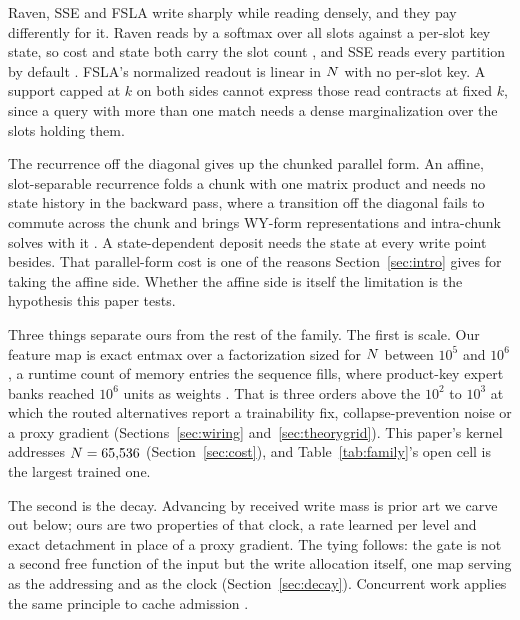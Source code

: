 Raven, SSE and FSLA write sharply while reading densely, and they pay differently for it. Raven reads by a softmax over all slots against a per-slot key state, so cost and state both carry the slot count \citep{afzal2026raven}, and SSE reads every partition by default \citep{sse2025}. FSLA's normalized readout is linear in $N$ with no per-slot key. A support capped at $k$ on both sides cannot express those read contracts at fixed $k$, since a query with more than one match needs a dense marginalization over the slots holding them.

The recurrence off the diagonal gives up the chunked parallel form. An affine, slot-separable recurrence folds a chunk with one matrix product and needs no state history in the backward pass, where a transition off the diagonal fails to commute across the chunk and brings WY-form representations and intra-chunk solves with it \citep{yang2024deltanet, yang2024gdn}. A state-dependent deposit needs the state at every write point besides. That parallel-form cost is one of the reasons Section~\ref{sec:intro} gives for taking the affine side. Whether the affine side is itself the limitation is the hypothesis this paper tests.

Three things separate ours from the rest of the family. The first is scale. Our feature map is exact entmax over a factorization sized for $N$ between $10^5$ and $10^6$, a runtime count of memory entries the sequence fills, where product-key expert banks reached $10^6$ units as weights \citep{lample2019pkm, he2024peer}. That is three orders above the $10^2$ to $10^3$ at which the routed alternatives report a trainability fix, collapse-prevention noise or a proxy gradient (Sections~\ref{sec:wiring} and~\ref{sec:theorygrid}). This paper's kernel addresses $N = 65{,}536$ (Section~\ref{sec:cost}), and Table~\ref{tab:family}'s open cell is the largest trained one.

The second is the decay. Advancing by received write mass is prior art we carve out below; ours are two properties of that clock, a rate learned per level and exact detachment in place of a proxy gradient. The tying follows: the gate is not a second free function of the input but the write allocation itself, one map serving as the addressing and as the clock (Section~\ref{sec:decay}). Concurrent work applies the same principle to cache admission \citep{cui2026hola}.

